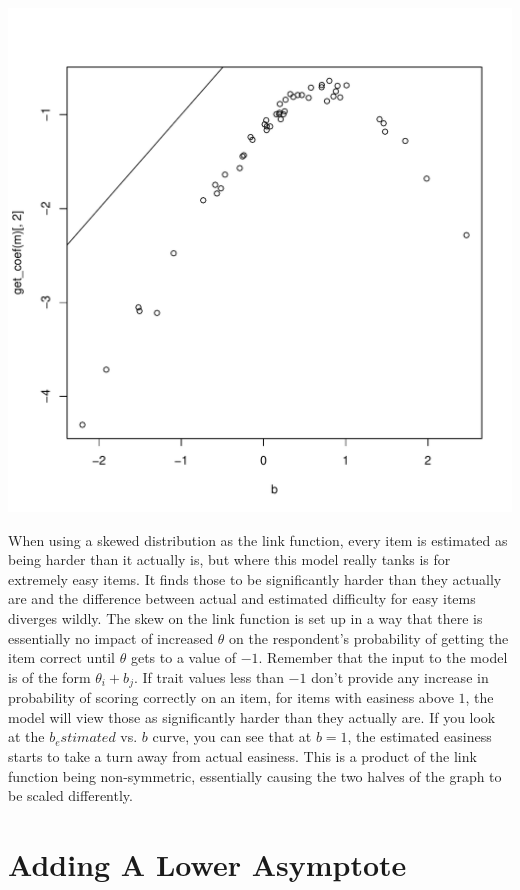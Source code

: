 \documentclass{article}\usepackage[]{graphicx}\usepackage[]{color}
\makeatletter
\def\maxwidth{ %
  \ifdim\Gin@nat@width>\linewidth
    \linewidth
  \else
    \Gin@nat@width
  \fi
}
\newenvironment{knitrout}{}{} %
\makeatother
\begin{document}
\begin{knitrout}
\includegraphics[width=\maxwidth]{figure/unnamed-chunk-12-3} 

\end{knitrout}

When using a skewed distribution as the link function, every item is estimated as being harder than it actually is, but where this model really tanks is for extremely easy items.  It finds those to be significantly harder than they actually are and the difference between actual and estimated difficulty for easy items diverges wildly.  The skew on the link function is set up in a way that there is essentially no impact of increased $\theta$ on the respondent's probability of getting the item correct until $\theta$ gets to a value of $-1$.  Remember that the input to the model is of the form $\theta_i + b_j$.  If trait values less than $-1$ don't provide any increase in probability of scoring correctly on an item, for items with easiness above $1$, the model will view those as significantly harder than they actually are.  If you look at the $b_estimated$ vs. $b$ curve, you can see that at $b =1$, the estimated easiness starts to take a turn away from actual easiness.  This is a product of the link function being non-symmetric, essentially causing the two halves of the graph to be scaled differently.

\pagebreak
\section{Adding A Lower Asymptote}
\end{document}
